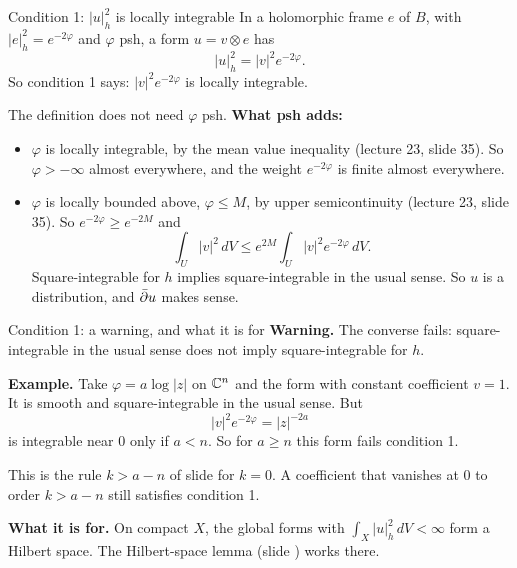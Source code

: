 \begin{frame}{Condition 1: \(|u|_h^2\) is locally integrable}
\label{fr:l2-first}
In a holomorphic frame \(e\) of \(B\), with \(|e|_h^2=e^{-2\varphi}\) and \(\varphi\) psh, a form \(u=v\otimes e\) has
\[
|u|_h^2=|v|^2e^{-2\varphi}.
\]
So condition 1 says: \(|v|^2e^{-2\varphi}\) is locally integrable.
\par\medskip
The definition does not need \(\varphi\) psh. \textbf{What psh adds:}
\begin{itemize}
\item \(\varphi\) is locally integrable, by the mean value inequality (lecture 23, slide 35). So \(\varphi>-\infty\) almost everywhere, and the weight \(e^{-2\varphi}\) is finite almost everywhere.
\item \(\varphi\) is locally bounded above, \(\varphi\le M\), by upper semicontinuity (lecture 23, slide 35). So \(e^{-2\varphi}\ge e^{-2M}\) and
\[
\int_U|v|^2\,dV\le e^{2M}\int_U|v|^2e^{-2\varphi}\,dV .
\]
Square-integrable for \(h\) implies square-integrable in the usual sense. So \(u\) is a distribution, and \(\bar\partial u\) makes sense.
\end{itemize}
\end{frame}

\begin{frame}{Condition 1: a warning, and what it is for}
\label{fr:l2-first-gives}
\textbf{Warning.} The converse fails: square-integrable in the usual sense does not imply square-integrable for \(h\).
\par\smallskip
\textbf{Example.} Take \(\varphi=a\log|z|\) on \(\mathbb C^n\) and the form with constant coefficient \(v=1\). It is smooth and square-integrable in the usual sense. But
\[
|v|^2e^{-2\varphi}=|z|^{-2a}
\]
is integrable near \(0\) only if \(a<n\). So for \(a\ge n\) this form fails condition 1.
\par\smallskip
This is the rule \(k>a-n\) of slide \hyperlink{fr:mi-logpole}{\pageref{fr:mi-logpole}} for \(k=0\). A coefficient that vanishes at \(0\) to order \(k>a-n\) still satisfies condition 1.
\par\medskip
\textbf{What it is for.} On compact \(X\), the global forms with \(\int_X|u|_h^2\,dV<\infty\) form a Hilbert space. The Hilbert-space lemma (slide \hyperlink{fr:hilbert-lemma}{\pageref{fr:hilbert-lemma}}) works there.
\end{frame}

